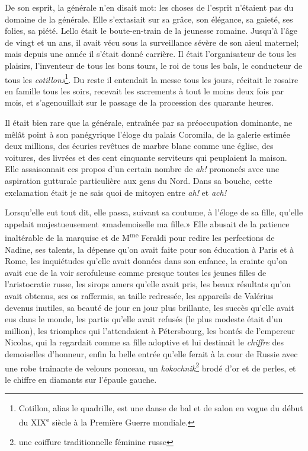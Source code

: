 De son esprit, la générale n'en disait mot: les choses de l'esprit
n'étaient pas du domaine de la générale. Elle s'extasiait sur sa grâce,
son élégance, sa gaieté, ses folies, sa piété. Lello était le
boute-en-train de la jeunesse romaine. Jusqu'à l'âge de vingt et un ans,
il avait vécu sous la surveillance sévère de son aïeul maternel; mais
depuis une année il s'était donné carrière. Il était l'organisateur de
tous les plaisirs, l'inventeur de tous les bons tours, le roi de tous
les bals, le conducteur de tous les \emph{cotillons}\footnote{Cotillon, alias le quadrille, est une danse de bal et de salon en vogue du début du XIX\textsuperscript{e} siècle à la Première Guerre mondiale.}. Du reste il entendait la messe tous les jours, récitait le rosaire en famille tous
les soirs, recevait les sacrements à tout le moins deux fois par mois,
et s'agenouillait sur le passage de la procession des quarante heures.

Il était bien rare que la générale, entraînée par sa préoccupation
dominante, ne mêlât point à son panégyrique l'éloge du palais Coromila,
de la galerie estimée deux millions, des écuries revêtues de marbre
blanc comme une église, des voitures, des livrées et des cent cinquante
serviteurs qui peuplaient la maison. Elle assaisonnait ces propos d'un
certain nombre de \emph{ah!} prononcés avec une aspiration gutturale
particulière aux gens du Nord. Dans sa bouche, cette exclamation était
je ne sais quoi de mitoyen entre \emph{ah!} et \emph{ach!}

Lorsqu'elle eut tout dit, elle passa, suivant sa coutume, à l'éloge de
sa fille, qu'elle appelait majestueusement «mademoiselle ma fille.» Elle
abusait de la patience inaltérable de la marquise et de
M\textsuperscript{me} Feraldi pour redire les perfections de Nadine, ses
talents, la dépense qu'on avait faite pour son éducation à Paris et à
Rome, les inquiétudes qu'elle avait données dans son enfance, la crainte
qu'on avait eue de la voir scrofuleuse comme presque toutes les jeunes
filles de l'aristocratie russe, les sirops amers qu'elle avait pris, les
beaux résultats qu'on avait obtenus, ses os raffermis, sa taille
redressée, les appareils de Valérius devenus inutiles, sa beauté de jour
en jour plus brillante, les succès qu'elle avait eus dans le monde, les
partis qu'elle avait refusés (le plus modeste était d'un million), les
triomphes qui l'attendaient à Pétersbourg, les bontés de l'empereur
Nicolas, qui la regardait comme sa fille adoptive et lui destinait le
\emph{chiffre} des demoiselles d'honneur, enfin la belle entrée qu'elle
ferait à la cour de Russie avec une robe traînante de velours ponceau,
un \emph{kokochnik}\footnote{une coiffure traditionnelle féminine russe} brodé d'or et de perles, et le chiffre en diamants
sur l'épaule gauche.

